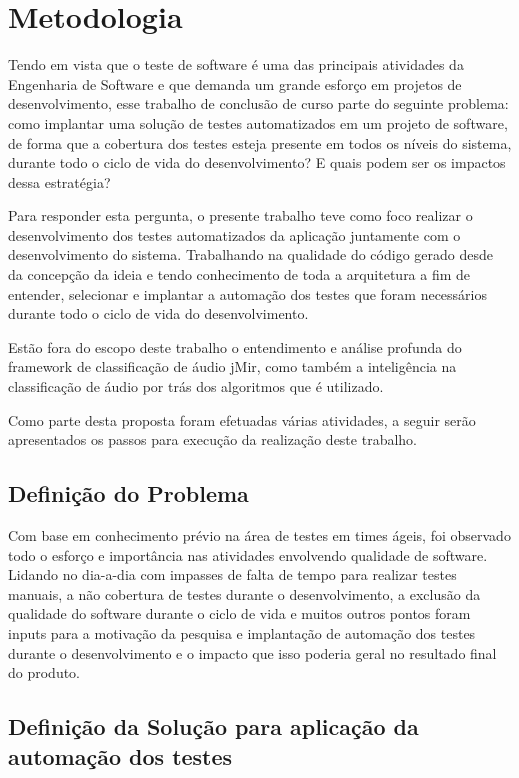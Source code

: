 \chapter{Metodologia}

Tendo em vista que o teste de software é uma das principais atividades da Engenharia 
de Software e que demanda um grande esforço em projetos de desenvolvimento, esse 
trabalho de conclusão de curso parte do seguinte problema: como implantar uma 
solução de testes automatizados em um projeto de software, de forma que a 
cobertura dos testes esteja presente em todos os níveis do sistema, durante todo o 
ciclo de vida do desenvolvimento? E quais podem ser os impactos dessa estratégia?

Para responder esta pergunta, o presente trabalho teve como foco realizar o  desenvolvimento dos testes automatizados da aplicação juntamente com o desenvolvimento do sistema.  Trabalhando na qualidade do código gerado desde da concepção da ideia e tendo conhecimento de toda a arquitetura a fim de entender, selecionar e implantar a automação dos testes que foram necessários durante todo o ciclo de vida do desenvolvimento.

Estão fora do escopo deste trabalho o entendimento e análise profunda do framework de classificação de áudio jMir, como também a inteligência na classificação de áudio por trás dos algoritmos que é utilizado.

Como parte desta proposta foram efetuadas várias atividades, a seguir serão apresentados os passos para execução da realização deste trabalho.

\section{Definição do Problema}

Com base em conhecimento prévio na área de testes em times ágeis,  foi observado todo o esforço e importância nas atividades envolvendo qualidade de software.  Lidando no dia-a-dia com impasses de falta de tempo para realizar testes manuais, a não cobertura de testes durante o desenvolvimento, a exclusão da qualidade do software durante o ciclo de vida e muitos outros pontos foram inputs para a motivação da pesquisa e implantação de automação dos testes durante o desenvolvimento e o impacto que isso poderia geral no resultado final do produto.

\section{Definição da Solução para aplicação da automação dos testes}

